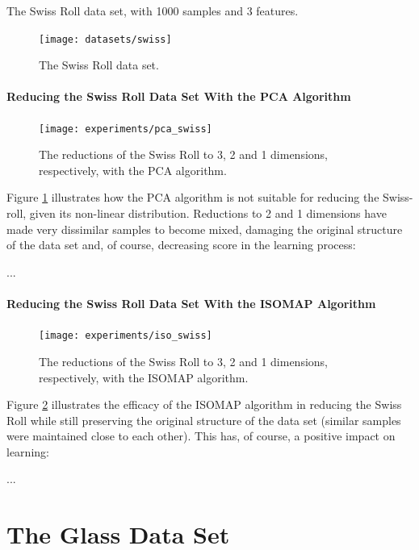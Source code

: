 The Swiss Roll data set, with 1000 samples and 3 features.

\begin{figure}[H]
	\centering
	\texttt{[image: datasets/swiss]}
	\captionsetup{justification=centering}
	\caption{The Swiss Roll data set.}
\end{figure}

\newpage
\paragraph{Reducing the Swiss Roll Data Set With the PCA Algorithm}

\begin{figure}[H]
	\centering
	\captionsetup{justification=centering}
	\texttt{[image: experiments/pca\_swiss]}
	\caption{The reductions of the Swiss Roll to 3, 2 and 1 dimensions, respectively, with the PCA algorithm.}
	\label{fig:dsswisspca}
\end{figure}

Figure \ref{fig:dsswisspca} illustrates how the PCA algorithm is not suitable for reducing the Swiss-roll, given its non-linear distribution. Reductions to 2 and 1 dimensions have made very dissimilar samples to become mixed, damaging the original structure of the data set and, of course, decreasing score in the learning process:

...

\paragraph{Reducing the Swiss Roll Data Set With the ISOMAP Algorithm}

\begin{figure}[H]
	\centering
	\captionsetup{justification=centering}
	\texttt{[image: experiments/iso\_swiss]}
	\caption{The reductions of the Swiss Roll to 3, 2 and 1 dimensions, respectively, with the ISOMAP algorithm.}
	\label{fig:dsswissiso}
\end{figure}

Figure \ref{fig:dsswissiso} illustrates the efficacy of the ISOMAP algorithm in reducing the Swiss Roll while still preserving the original structure of the data set (similar samples were maintained close to each other). This has, of course, a positive impact on learning:

...

\clearpage
\section{The Glass Data Set}

